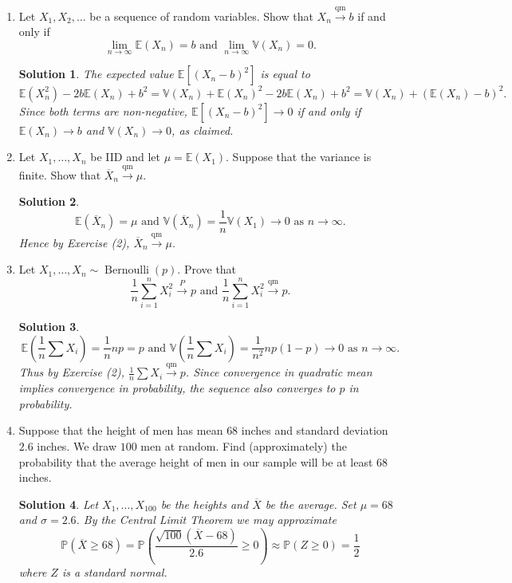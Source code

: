 \documentclass[10pt]{article}
\newtheorem*{sol}{Solution}
\renewcommand{\P}{\mathbb{P}}
\newcommand{\V}{\mathbb{V}}
\newcommand{\E}{\mathbb{E}}
\newcommand{\Bern}{\operatorname{Bernoulli}}
\newcommand{\toP}{\xrightarrow{P}}
\newcommand{\toqm}{\xrightarrow{\text{qm}}}
\begin{document}
\begin{enumerate}
\item[(2)] Let $X_1,X_2,\ldots$ be a sequence of random variables.
Show that $X_n\toqm b$ if and only if
\[
\lim_{n\to\infty} \E(X_n) = b \text{ and } \lim_{n\to\infty} \V(X_n) = 0.
\]

\begin{sol}
The expected value $\E[(X_n-b)^2]$ is equal to
\[
\E(X_n^2) - 2b\E(X_n) + b^2 =
\V(X_n) + \E(X_n)^2 - 2b\E(X_n) + b^2 = \V(X_n) + (\E(X_n) - b)^2.
\]
Since both terms are non-negative, $\E[(X_n-b)^2]\to 0$ if and only if
$\E(X_n)\to b$ and $\V(X_n)\to 0$, as claimed.
\end{sol}

\item[(3)] Let $X_1,\ldots,X_n$ be IID and let $\mu=\E(X_1)$. Suppose that the
variance is finite. Show that $\overline X_n \toqm \mu$.

\begin{sol}
\[
\E(\overline X_n) = \mu \text{ and } \V(\overline X_n) = \frac{1}{n} \V(X_1) \to 0
\text{ as } n\to\infty.
\]
Hence by Exercise (2), $\overline X_n \toqm \mu$.
\end{sol}

\item[(5)] Let $X_1,\ldots,X_n\sim \Bern(p)$. Prove that
\[
\frac{1}{n}\sum_{i=1}^n X_i^2\toP p \text{ and }
\frac{1}{n}\sum_{i=1}^n X_i^2\toqm p.
\]

\begin{sol}
\[
\E\left(\frac{1}{n}\sum X_i\right) = \frac{1}{n}np = p \text{ and }
\V\left(\frac{1}{n}\sum X_i\right) = \frac{1}{n^2}np(1-p)\to 0
\text{ as } n\to \infty.
\]
Thus by Exercise (2), $\frac{1}{n}\sum X_i\toqm p$. Since convergence in quadratic
mean implies convergence in probability, the sequence also converges to $p$
in probability.
\end{sol}

\item[(6)] Suppose that the height of men has mean $68$ inches and standard deviation
$2.6$ inches. We draw $100$ men at random. Find (approximately)
the probability that the average height of men in our sample will be at
least $68$ inches.

\begin{sol}
Let $X_1,\ldots,X_{100}$ be the heights and $\overline X$ be the average.
Set $\mu=68$ and $\sigma=2.6$.
By the Central Limit Theorem we may approximate
\[
\P(\overline X \geq 68) =
\P\left(\frac{\sqrt{100}(\overline X - 68)}{2.6} \geq 0\right) \approx
\P(Z\geq 0) = \frac{1}{2}
\]
where $Z$ is a standard normal.
\end{sol}


\end{enumerate}
\end{document}
